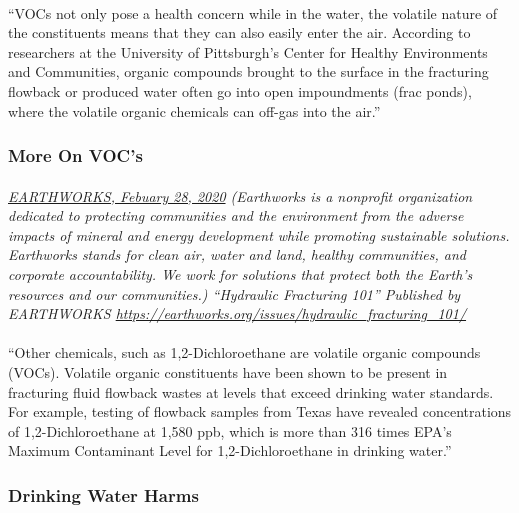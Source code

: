 \documentclass{article}
\begin{document}
\paragraph{}
``VOCs not only pose a health concern while in the water, the volatile nature of the constituents means that they can also easily enter the air. According to researchers at the  University of Pittsburgh’s Center for Healthy Environments and Communities, organic compounds brought to the surface in the fracturing flowback or produced water often go into open impoundments (frac ponds), where the volatile organic chemicals can off-gas into the air.''

\subsubsection{More On VOC's}
\paragraph{}
\small
\textit{
\underline{EARTHWORKS, Febuary 28, 2020}
(Earthworks is a nonprofit organization dedicated to protecting communities and the environment from the adverse impacts of mineral and energy development while promoting sustainable solutions. Earthworks stands for clean air, water and land, healthy communities, and corporate accountability. We work for solutions that protect both the Earth’s resources and our communities.) “Hydraulic Fracturing 101” Published by EARTHWORKS 
\url{https://earthworks.org/issues/hydraulic_fracturing_101/}}
\normalsize

\paragraph{}
``Other chemicals, such as 1,2-Dichloroethane are volatile organic compounds (VOCs). Volatile organic constituents have been shown to be present in fracturing fluid flowback wastes at levels that exceed drinking water standards. For example, testing of flowback samples from Texas have revealed concentrations of 1,2-Dichloroethane at 1,580 ppb, which is more than 316 times EPA’s Maximum Contaminant Level for 1,2-Dichloroethane in drinking water.''

\subsubsection{Drinking Water Harms}
\end{document}
